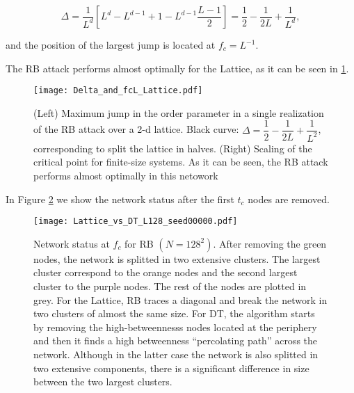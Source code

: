 \documentclass{article}
\begin{document}
\begin{equation}
\Delta = \dfrac{1}{L^d} \left[ L^d - L^{d-1} + 1 - L^{d-1} \dfrac{L-1}{2} \right] = \dfrac{1}{2} - \dfrac{1}{2L} + \dfrac{1}{L^d},
\end{equation}

and the position of the largest jump is located at $f_c = L^{-1}$.

The RB attack performs almost optimally for the Lattice, as it can be seen in \ref{fig:Delta_Lattice}.

\begin{figure}
\centering
\texttt{[image: Delta\_and\_fcL\_Lattice.pdf]}
\caption{\label{fig:Delta_Lattice} (Left) Maximum jump in the order parameter in a single realization of the RB attack over a 2-d lattice. Black curve: $\Delta = \dfrac{1}{2}-\dfrac{1}{2L} + \dfrac{1}{L^2}$, corresponding to split the lattice in halves. (Right) Scaling of the critical point for finite-size systems. As it can be seen, the RB attack performs almost optimally in this netowork}
\end{figure}

In Figure \ref{fig:attack_draw} we show the network status after the first $t_c$ nodes are removed. 

\begin{figure}
\centering
\texttt{[image: Lattice\_vs\_DT\_L128\_seed00000.pdf]}
\caption{\label{fig:attack_draw} Network status at $f_c$ for RB $(N = 128^2)$. After removing the green nodes, the network is splitted in two extensive clusters. The largest cluster correspond to the orange nodes and the second largest cluster to the purple nodes. The rest of the nodes are plotted in grey. For the Lattice, RB traces a diagonal and break the network in two clusters of almost the same size. For DT, the algorithm starts by removing the high-betweennesss nodes located at the periphery and then it finds a high betweenness ``percolating path'' across  the network. Although in the latter case the network is also splitted in two extensive components, there is a significant difference in size between the two largest clusters. }
\end{figure}
\end{document}
